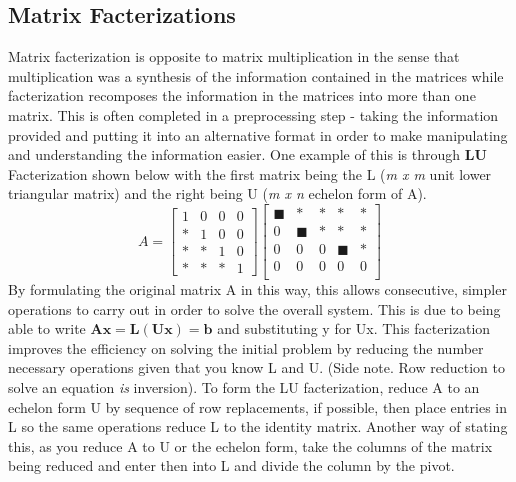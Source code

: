 \documentclass[12pt]{article}
\begin{document}
\subsection{Matrix Facterizations}
Matrix facterization is opposite to matrix multiplication in the sense that multiplication was a synthesis of the information contained in the matrices while %
facterization recomposes the information in the matrices into more than one matrix. This is often completed in a preprocessing step - taking the information %
provided and putting it into an alternative format in order to make manipulating and understanding the information easier. One example of this is through %
\textbf{LU} Facterization shown below with the first matrix being the L (\textit{m x m} unit lower triangular matrix) and the right being U (\textit{m x n} echelon %
form of A). %
\newline
$$
A=\begin{bmatrix}
    1 & 0 & 0 & 0 \\
    * & 1 & 0 & 0 \\
    * & * & 1 & 0 \\
    * & * & * & 1
\end{bmatrix}\begin{bmatrix}
    \scriptstyle \blacksquare & * & * & * & * \\
    0 & \scriptstyle \blacksquare & * & * & * \\
    0 & 0 & 0 & \scriptstyle \blacksquare & * \\
    0 & 0 & 0 & 0 & 0 \\
\end{bmatrix}
$$
\newline
By formulating the original matrix A in this way, this allows consecutive, simpler operations to carry out in order to solve the overall system. This is due to %
being able to write $\mathbf{Ax=L(Ux)=b}$ and substituting y for Ux. This facterization improves the efficiency on solving the initial problem by reducing the number %
necessary operations given that you know L and U. (Side note. Row reduction to solve an equation \textit{is} inversion). To form the LU facterization, reduce A to %
an echelon form U by sequence of row replacements, if possible, then place entries in L so the same operations reduce L to the identity matrix. Another way of stating %
this, as you reduce A to U or the echelon form, take the columns of the matrix being reduced and enter then into L and divide the column by the pivot. 
\end{document}
